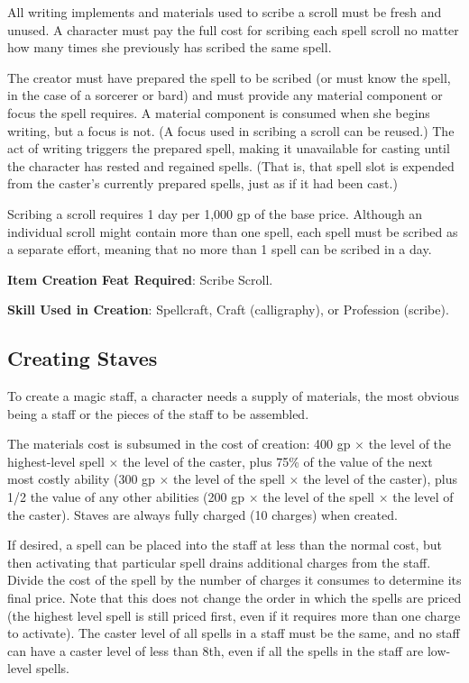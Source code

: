 All writing implements and materials used to scribe a scroll must be fresh and unused. A character must pay the full cost for scribing each spell scroll no matter how many times she previously has scribed the same spell.
				
The creator must have prepared the spell to be scribed (or must know the spell, in the case of a sorcerer or bard) and must provide any material component or focus the spell requires. A material component is consumed when she begins writing, but a focus is not. (A focus used in scribing a scroll can be reused.) The act of writing triggers the prepared spell, making it unavailable for casting until the character has rested and regained spells. (That is, that spell slot is expended from the caster's currently prepared spells, just as if it had been cast.)
				
Scribing a scroll requires 1 day per 1,000 gp of the base price. Although an individual scroll might contain more than one spell, each spell must be scribed as a separate effort, meaning that no more than 1 spell can be scribed in a day.
				
\textbf{Item Creation Feat Required}: Scribe Scroll.
				
\textbf{Skill Used in Creation}: Spellcraft, Craft (calligraphy), or Profession (scribe).
				
\subsection{Creating Staves}

				
To create a magic staff, a character needs a supply of materials, the most obvious being a staff or the pieces of the staff to be assembled.
				
The materials cost is subsumed in the cost of creation: 400 gp \mbox{$\times$} the level of the highest-level spell \mbox{$\times$} the level of the caster, plus 75\% of the value of the next most costly ability (300 gp \mbox{$\times$} the level of the spell \mbox{$\times$} the level of the caster), plus 1/2 the value of any other abilities (200 gp \mbox{$\times$} the level of the spell \mbox{$\times$} the level of the caster). Staves are always fully charged (10 charges) when created.
				
If desired, a spell can be placed into the staff at less than the normal cost, but then activating that particular spell drains additional charges from the staff. Divide the cost of the spell by the number of charges it consumes to determine its final price. Note that this does not change the order in which the spells are priced (the highest level spell is still priced first, even if it requires more than one charge to activate). The caster level of all spells in a staff must be the same, and no staff can have a caster level of less than 8th, even if all the spells in the staff are low-level spells.
				
